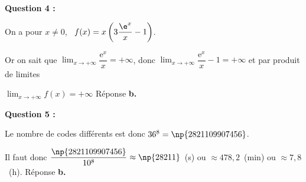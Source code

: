 \textbf{Question 4 :}









On a pour $x \ne 0$, \, $f(x) = x\left(3\dfrac{\e^x}{x}  - 1\right)$.

Or on sait que $\displaystyle\lim_{x \to + \infty} \dfrac{\text{e}^x}{x} = + \infty$, donc 
$\displaystyle\lim_{x \to + \infty} \dfrac{\text{e}^x}{x} - 1 = + \infty$ et par produit de limites
 
$\displaystyle\lim_{x \to + \infty} f(x) = + \infty$ Réponse \textbf{b.}
\medskip

\textbf{Question 5 :}














Le nombre de codes différents est donc $36^8 = \np{2821109907456}$.

Il faut donc $\dfrac{\np{2821109907456}}{10^8} \approx \np{28211}$~(s) ou $\approx 478,2$~(min) ou $\approx 7,8$~(h). Réponse \textbf{b.}

\bigskip
